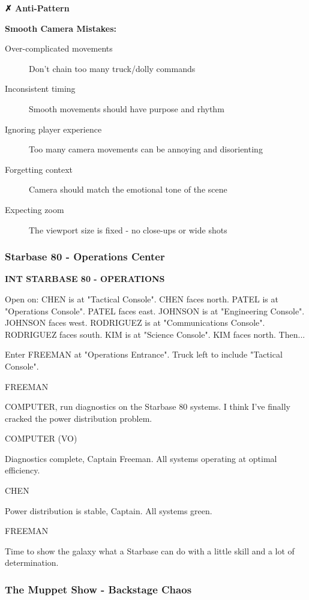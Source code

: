 \documentclass[11pt,letterpaper,oldstylefigures]{memoir}
\newcommand{\slugline}[1]{\nobreak\textbf{\MakeUppercase{#1}}\par\nobreak\vspace{1\baselineskip}}
\newcommand{\speaker}[1]{\nobreak\hspace*{0.333\textwidth}\MakeUppercase{#1}\par\nobreak\vspace{0.5\baselineskip}}
\newcommand{\dialogue}[1]{\nobreak\hspace*{0.25\textwidth}\begin{minipage}{0.5\textwidth}#1\end{minipage}\par\vspace{1\baselineskip}}
\newcommand{\stagedir}[1]{#1\par\vspace{1\baselineskip}}
\newenvironment{FountainExample}
  {\begingroup
  \ttfamily\small
   \setlength{\parindent}{0pt}
  \setlength{\parskip}{0.5em}
  \allowdisplaybreaks
  \setlength{\displaywidowpenalty}{0}
  \setlength{\widowpenalty}{0}
  \setlength{\clubpenalty}{0}
  \setlength{\interlinepenalty}{0}
}
  {\endgroup}
\newenvironment{AntiPattern}
{\begingroup
\small
\setlength{\parindent}{0pt}
\setlength{\parskip}{0.5em}
\allowdisplaybreaks
\setlength{\displaywidowpenalty}{0}
\setlength{\widowpenalty}{0}
\setlength{\clubpenalty}{0}
\setlength{\interlinepenalty}{0}
\begin{tcolorbox}[
    colback=red!5,
    colframe=red!75!black,
    boxrule=0.5pt,
    arc=2pt,
    left=0.5em,
    right=0.5em,
    top=0.25em,
    bottom=0.25em
]
\textbf{✗ Anti-Pattern}
\end{tcolorbox}\par
}
{\endgroup}
\begin{document}
\begin{AntiPattern}
\textbf{Smooth Camera Mistakes:}
\begin{description}
\item[Over-complicated movements] Don't chain too many truck/dolly commands
\item[Inconsistent timing] Smooth movements should have purpose and rhythm
\item[Ignoring player experience] Too many camera movements can be annoying and disorienting
\item[Forgetting context] Camera should match the emotional tone of the scene
\item[Expecting zoom] The viewport size is fixed - no close-ups or wide shots
\end{description}
\end{AntiPattern}

\subsubsection*{Starbase 80 - Operations Center}
\label{ex:starbase-80-operations}

\begin{FountainExample}
\slugline{INT STARBASE 80 - OPERATIONS}

\stagedir{Open on: CHEN is at "Tactical Console". CHEN faces north. PATEL is at "Operations Console". PATEL faces east. JOHNSON is at "Engineering Console". JOHNSON faces west. RODRIGUEZ is at "Communications Console". RODRIGUEZ faces south. KIM is at "Science Console". KIM faces north. Then...}
\stagedir{Enter FREEMAN at "Operations Entrance". Truck left to include "Tactical Console".}

\speaker{FREEMAN}
\dialogue{COMPUTER, run diagnostics on the Starbase 80 systems. I think I've finally cracked the power distribution problem.}

\speaker{COMPUTER (VO)}
\dialogue{Diagnostics complete, Captain Freeman. All systems operating at optimal efficiency.}

\speaker{CHEN}
\dialogue{Power distribution is stable, Captain. All systems green.}

\speaker{FREEMAN}
\dialogue{Time to show the galaxy what a Starbase can do with a little skill and a lot of determination.}
\end{FountainExample}

\subsubsection*{The Muppet Show - Backstage Chaos}
\label{ex:muppet-show-backstage}
\end{document}
